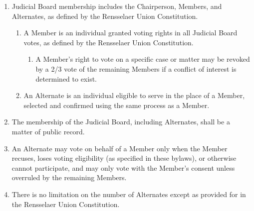\begin {enumerate}
    \item Judicial Board membership includes the Chairperson, Members, and Alternates, as defined by the Rensselaer Union Constitution.
    \begin {enumerate}
        \item A Member is an individual granted voting rights in all Judicial Board votes, as defined by the Rensselaer Union Constitution. 
        \begin {enumerate}
            \item A Member’s right to vote on a specific case or matter may be revoked by a 2/3 vote of the remaining Members if a conflict of interest is determined to exist.
        \end {enumerate}
        \item An Alternate is an individual eligible to serve in the place of a Member, selected and confirmed using the same process as a Member.
    \end {enumerate}
    \item The membership of the Judicial Board, including Alternates, shall be a matter of public record.
    \item An Alternate may vote on behalf of a Member only when the Member recuses, loses voting eligibility (as specified in these bylaws), or otherwise cannot participate, and may only vote with the Member’s consent unless overruled by the remaining Members.
    \item There is no limitation on the number of Alternates except as provided for in the Rensselaer Union Constitution.
\end {enumerate}


